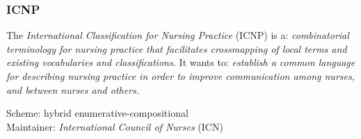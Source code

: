 %
%
%
%
%
%
%

\subsubsection{ICNP}
\label{icnp_heading}

The \emph{International Classification for Nursing Practice} (ICNP) is a:
\textit{combinatorial terminology for nursing practice that facilitates
crossmapping of local terms and existing vocabularies and classifications.} It
wants to: \textit{establish a common language for describing nursing practice
in order to improve communication among nurses, and between nurses and others.}
\cite{icnp}

Scheme: hybrid enumerative-compositional\\
Maintainer: \emph{International Council of Nurses} (ICN)
